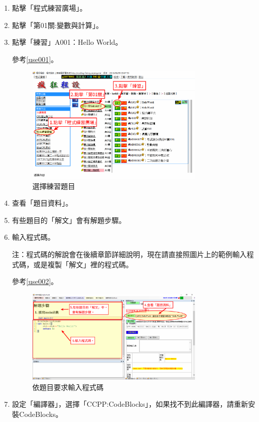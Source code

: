 \begin{enumerate}
\item 點擊「程式練習廣場」。
\item 點擊「第01關:變數與計算」。
\item 點擊「練習」A001：Hello World。

參考\autoref{use001}。
\begin{figure}[H]
	\centering
	\includegraphics[width=0.8\textwidth]{fig/install_and_setting/use_001}
	\caption{選擇練習題目}
	\label{use001}
\end{figure}


\item 查看「題目資料」。
\item 有些題目的「解文」會有解題步驟。
\item 輸入程式碼。

注：程式碼的解說會在後續章節詳細說明，現在請直接照圖片上的範例輸入程式碼，或是複製「解文」裡的程式碼。

參考\autoref{use002}。
\begin{figure}[H]
	\centering
	\includegraphics[width=0.8\textwidth]{fig/install_and_setting/use_002}
	\caption{依題目要求輸入程式碼}
	\label{use002}
\end{figure}


\item 設定「編譯器」，選擇「CCPP:CodeBlocks」，如果找不到此編譯器，請重新安裝CodeBlocks。


\end{enumerate}
